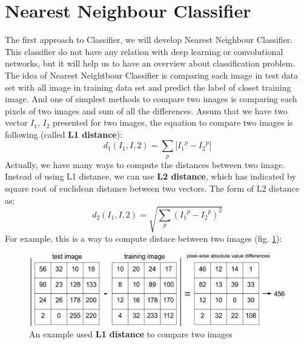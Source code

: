 \section{Nearest Neighbour Classifier}
The first approach to Classifier, we will develop Nearest Neighbour Classifier. This classifier do not have any relation with deep learning or convolutional networks, but it will help us to have an overview about classification problem.\\[0.2cm]
The idea of Nearest Neightbour Classifier is comparing each image in test data set with all image in training data set and predict the label of closet training image. And one of simplest methods to compare two images is comparing each pixels of two images and sum of all the differences. Assum that we have two vector \textbf{$I_1$}, \textbf{$I_2$} presented for two images, the equation to compare two images is following (called \textbf{L1 distance}):
\begin{equation}
	d_1(I_1,I,2)=\sum_{p}|{I_1}^p - {I_2}^p|
\end{equation}
Actually, we have many ways to compute the distances between two image. Instead of using L1 distance, we can use \textbf{L2 distance}, which has indicated by square root of euclidean distance between two vectors. The form of L2 distance as: 
\begin{equation}
	d_2(I_1,I,2) = \sqrt{\sum_{p}{({I_1}^p - {I_2}^p)}^2}
\end{equation}
For example, this is a way to compute distace between two images  (fig. \ref{fignncl1}):
\begin{figure}[h]
	\centering
	\includegraphics[scale=0.3]{images/nncl1.jpeg}
	\caption{An example used \textbf{L1 distance} to compare two images}
	\label{fignncl1}
\end{figure}
